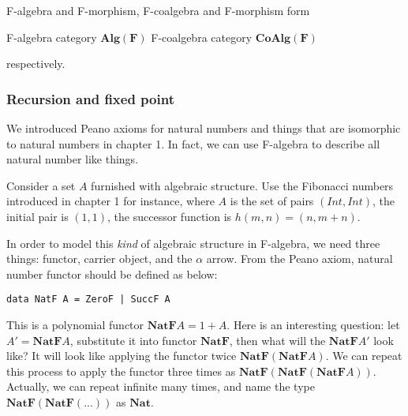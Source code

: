 \documentclass{article}
\begin{document}
F-algebra and F-morphism, F-coalgebra and F-morphism form

\begin{center}
  F-algebra category $\pmb{Alg}(\mathbf{F})$ \quad \quad \quad
  F-coalgebra category $\pmb{CoAlg}(\mathbf{F})$
\end{center}

respectively.

\begin{Exercise}
\end{Exercise}

\subsubsection{Recursion and fixed point}

We introduced Peano axioms for natural numbers and things that are isomorphic to natural numbers in chapter 1. In fact, we can use F-algebra to describe all natural number like things.

Consider a set $A$ furnished with algebraic structure. Use the Fibonacci numbers introduced in chapter 1 for instance, where $A$ is the set of pairs $(Int, Int)$, the initial pair is $(1, 1)$, the successor function is $h(m, n) = (n, m + n)$.

In order to model this {\em kind} of algebraic structure in F-algebra, we need three things: functor, carrier object, and the $\alpha$ arrow. From the Peano axiom, natural number functor should be defined as below:

\lstset{frame=none}
\begin{lstlisting}
data NatF A = ZeroF | SuccF A
\end{lstlisting}

This is a polynomial functor $\mathbf{NatF} A = 1 + A$. Here is an interesting question: let $A' = \mathbf{NatF} A$, substitute it into functor $\mathbf{NatF}$, then what will the $\mathbf{NatF} A'$ look like? It will look like applying the functor twice $\mathbf{NatF}(\mathbf{NatF} A)$. We can repeat this process to apply the functor three times as $\mathbf{NatF}(\mathbf{NatF}(\mathbf{NatF} A))$. Actually, we can repeat infinite many times, and name the type $\mathbf{NatF}(\mathbf{NatF}(...))$ as $\mathbf{Nat}$.
\end{document}
